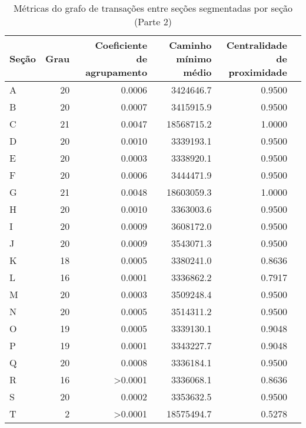 \begin{table}[htb]
\centering
\caption{Métricas do grafo de transações entre seções segmentadas por seção (Parte 2)}
\label{tab:metricas-redes:grafo-por-secao-especificas2}
    \begin{tabular}{l|rrrrr}
    \toprule
    Seção &  Grau &  \shortstack{Coeficiente\\de agrupamento} &  \shortstack{Caminho\\mínimo médio} &  \shortstack{Centralidade\\de proximidade} \\
    \midrule
    A &      20 &      0.0006 &           3424646.7 &                0.9500 \\
    B &      20 &      0.0007 &           3415915.9 &                0.9500 \\
    C &      21 &      0.0047 &          18568715.2 &                1.0000 \\
    D &      20 &      0.0010 &           3339193.1 &                0.9500 \\
    E &      20 &      0.0003 &           3338920.1 &                0.9500 \\
    F &      20 &      0.0006 &           3444471.9 &                0.9500 \\
    G &      21 &      0.0048 &          18603059.3 &                1.0000 \\
    H &      20 &      0.0010 &           3363003.6 &                0.9500 \\
    I &      20 &      0.0009 &           3608172.0 &                0.9500 \\
    J &      20 &      0.0009 &           3543071.3 &                0.9500 \\
    K &      18 &      0.0005 &           3380241.0 &                0.8636 \\
    L &      16 &      0.0001 &           3336862.2 &                0.7917 \\
    M &      20 &      0.0003 &           3509248.4 &                0.9500 \\
    N &      20 &      0.0005 &           3514311.2 &                0.9500 \\
    O &      19 &      0.0005 &           3339130.1 &                0.9048 \\
    P &      19 &      0.0001 &           3343227.7 &                0.9048 \\
    Q &      20 &      0.0008 &           3336184.1 &                0.9500 \\
    R &      16 &      >0.0001 &           3336068.1 &                0.8636 \\
    S &      20 &      0.0002 &           3353632.5 &                0.9500 \\
    T &       2 &      >0.0001 &          18575494.7 &                0.5278 \\
    \bottomrule
    \end{tabular}
\fdadospesquisa
\end{table}

